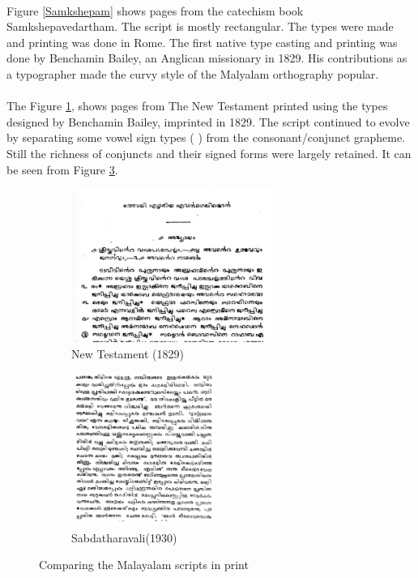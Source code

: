 \documentclass[10pt]{article}
\begin{document}
\paragraph{}
Figure \ref{Samkshepam} shows pages from the catechism book Samkshepavedartham. The script is mostly rectangular. The types were made and printing was done in Rome. The first native type casting and printing was done by Benchamin Bailey, an Anglican missionary in 1829.  His contributions as a typographer made the curvy style of the Malyalam orthography popular\cite{gupthannair}.


\paragraph{}
The Figure \ref{newtestament}, shows pages from The New Testament printed using the types designed by Benchamin Bailey, imprinted in 1829\cite{babucherian}. The script continued to evolve by separating some vowel sign types ({ }) from the consonant/conjunct grapheme. Still the richness of conjuncts and their signed forms were largely retained. It can be seen from Figure \ref{Sabdatharavali}. 


\begin{figure}[h!]
\begin{subfigure}{.5\textwidth}
 \centering
 \includegraphics[width=\linewidth, height=5cm]{images/newtestament1829.png}
 \caption{New Testament (1829)}
 \label{newtestament}
\end{subfigure}%
\begin{subfigure}{.5\textwidth}
 \centering
 \includegraphics[width=\linewidth,height=5cm]{images/1930-Sabdatharavali.png}
 \caption{Sabdatharavali(1930)}
 \label{Sabdatharavali}
\end{subfigure}
\caption{Comparing the Malayalam scripts in print}
\end{figure}
\end{document}
